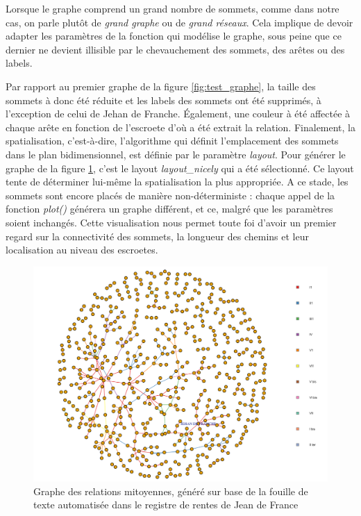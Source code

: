 Lorsque le graphe comprend un grand nombre de sommets, comme dans  notre cas, on parle plutôt de \textit{grand graphe} ou de \textit{grand réseaux}. Cela implique de devoir adapter les paramètres  de la fonction qui modélise le  graphe, sous peine que ce dernier ne devient illisible par le chevauchement des sommets, des arêtes ou des labels.

Par rapport au premier graphe de la figure \ref{fig:test_graphe}, la taille des sommets à donc été réduite et les labels des sommets ont été supprimés, à l'exception de celui de Jehan de Franche. Également,  une couleur à été affectée à chaque arête en fonction de l'escroete d'où a été extrait la relation. Finalement, la spatialisation, c'est-à-dire,  l'algorithme qui définit l'emplacement des sommets dans le plan bidimensionnel, est définie par le paramètre \textit{layout}. Pour générer le graphe de la figure  \ref{fig:plot_igraph}, c'est le layout \textit{layout\_nicely} qui a été sélectionné. Ce layout tente de déterminer lui-même la spatialisation la plus appropriée. A ce stade, les sommets sont encore placés de manière non-déterministe : chaque appel de la fonction \textit{plot()}  générera un graphe différent, et ce, malgré que les paramètres soient inchangés. Cette visualisation nous permet toute foi d'avoir un premier regard  sur la connectivité  des sommets, la longueur des chemins et leur localisation au niveau des escroetes.

\begin{figure}
    \centering
    \includegraphics[scale=0.45]{3.Results/Img/plot_igraph.png}
    \caption{Graphe des relations mitoyennes, généré sur base de la fouille de texte automatisée dans le registre de rentes de Jean de France }
    \label{fig:plot_igraph}
\end{figure}

